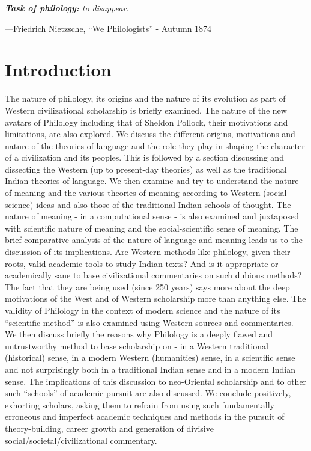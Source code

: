 \textit{\textbf{Task of philology:} to disappear.}

—Friedrich Nietzsche, “We Philologists” - Autumn 1874


\section*{Introduction}

The nature of philology, its origins and the nature of its evolution as part of Western civilizational scholarship is briefly examined. The nature of the new avatars of Philology including that of Sheldon Pollock, their motivations and limitations, are also explored. We discuss the different origins, motivations and nature of the theories of language and the role they play in shaping the character of a civilization and its peoples. This is followed by a section discussing and dissecting the Western (up to present-day theories) as well as the traditional Indian theories of language. We then examine and try to understand the nature of meaning and the various theories of meaning according to Western (social-science) ideas and also those of the traditional Indian schools of thought. The nature of meaning - in a computational sense - is also examined and juxtaposed with scientific nature of meaning and the social-scientific sense of meaning. The brief comparative analysis of the nature of language and meaning leads us to the discussion of its implications. Are Western methods like philology, given their roots, valid academic tools to study Indian texts? And is it appropriate or academically sane to base civilizational commentaries on such dubious methods? The fact that they are being used (since 250 years) says more about the deep motivations of the West and of Western scholarship more than anything else. The validity of Philology in the context of modern science and the nature of its “scientific method” is also examined using Western sources and commentaries. We then discuss briefly the reasons why Philology is a deeply flawed and untrustworthy method to base scholarship on - in a Western traditional (historical) sense, in a modern Western (humanities) sense, in a scientific sense and not surprisingly both in a traditional Indian sense and in a modern Indian sense. The implications of this discussion to neo-Oriental scholarship and to other such “schools” of academic pursuit are also discussed. We conclude positively, exhorting scholars, asking them to refrain from using such fundamentally erroneous and imperfect academic techniques and methods in the pursuit of theory-building, career growth and generation of divisive social/societal/civilizational commentary.


